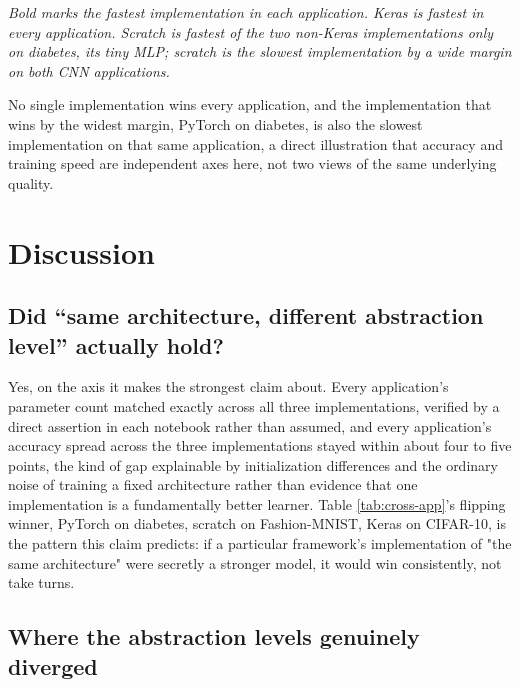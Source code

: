 \documentclass[11pt]{article}
\begin{document}
\noindent\textit{Bold marks the fastest implementation in each application.
Keras is fastest in every application. Scratch is fastest of the two
non-Keras implementations only on diabetes, its tiny MLP; scratch is the
slowest implementation by a wide margin on both CNN applications.}

No single implementation wins every application, and the implementation that
wins by the widest margin, PyTorch on diabetes, is also the slowest
implementation on that same application, a direct illustration that accuracy
and training speed are independent axes here, not two views of the same
underlying quality.

\section{Discussion}
\label{sec:discussion}

\subsection{Did ``same architecture, different abstraction level'' actually hold?}

Yes, on the axis it makes the strongest claim about. Every application's
parameter count matched exactly across all three implementations, verified by
a direct assertion in each notebook rather than assumed, and every
application's accuracy spread across the three implementations stayed within
about four to five points, the kind of gap explainable by initialization
differences and the ordinary noise of training a fixed architecture rather
than evidence that one implementation is a fundamentally better learner.
Table \ref{tab:cross-app}'s flipping winner, PyTorch on diabetes, scratch on
Fashion-MNIST, Keras on CIFAR-10, is the pattern this claim predicts: if a
particular framework's implementation of "the same architecture" were
secretly a stronger model, it would win consistently, not take turns.

\subsection{Where the abstraction levels genuinely diverged}
\end{document}

